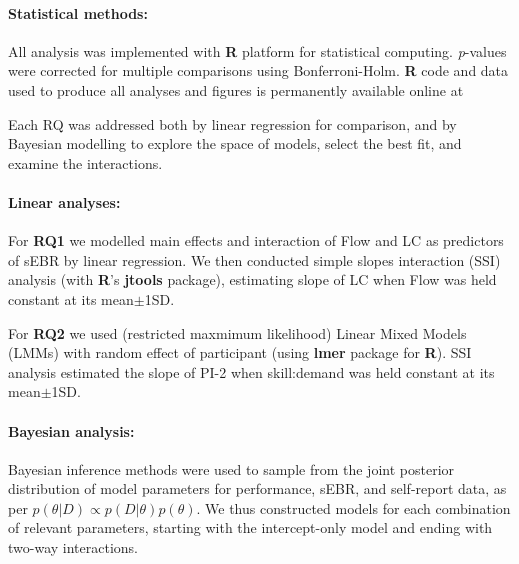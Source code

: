 \documentclass[10pt,letterpaper,floatsintext]{article}
\begin{document}
\paragraph{Statistical methods:}
All analysis was implemented with {\bf R} platform for statistical computing. {\it p}-values were corrected for multiple comparisons using Bonferroni-Holm. {\bf R} code and data used to produce all analyses and figures is permanently available online at 

Each RQ was addressed both by linear regression for comparison, and by Bayesian modelling to explore the space of models, select the best fit, and examine the interactions. 

\paragraph{Linear analyses:}
For {\bf RQ1} we modelled main effects and interaction of Flow and LC as predictors of sEBR by linear regression. We then conducted simple slopes interaction (SSI) analysis (with {\bf R}'s {\bf jtools} package), estimating slope of LC when Flow was held constant at its mean$\pm$1SD. 

For \textbf{RQ2} we used (restricted maxmimum likelihood) Linear Mixed Models (LMMs) with random effect of participant (using {\bf lmer} package for {\bf R}). SSI analysis estimated the slope of PI-2 when skill:demand was held constant at its mean$\pm$1SD.

\paragraph{Bayesian analysis:}
Bayesian inference methods were used to sample from the joint posterior distribution of model parameters for performance, sEBR, and self-report data, as per $p(\theta|D) \propto p(D|\theta)p(\theta)$. We thus constructed models for each combination of relevant parameters, starting with the intercept-only model and ending with two-way interactions.  

\end{document}
